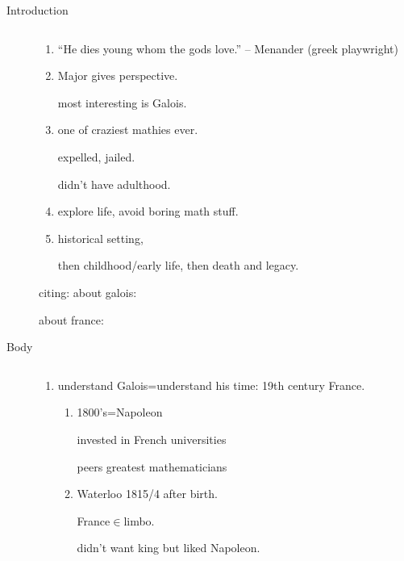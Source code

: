 \documentclass[letterpaper]{article}
\begin{document}
\begin{multicols}{2}
\renewcommand{\labelenumi}{\Roman{enumi}}
\renewcommand{\labelenumii}{\Alph{enumii}.}

\begin{description}
\item[Introduction]$\quad$

  \begin{enumerate}
  \item
  ``He dies young whom the gods love.'' -- Menander (greek playwright)
  \item
  Major gives perspective.
  
  most interesting is Galois.
  \item
  one of craziest mathies ever.

  expelled, jailed.

  didn't have adulthood.
  \item
  explore life, avoid boring math stuff.
  \item
  historical setting,

  then childhood/early life,
  then death and legacy.
  \end{enumerate}

  citing: about galois: \cite{gods}

  about france: \cite{france}
\item[Body]$\quad$

\begin{enumerate}
  \item
  understand Galois=understand his time: 19th century France.

  \begin{enumerate}
    \item
    1800's=Napoleon

    invested in French universities
    
    peers greatest mathematicians
    \item
    Waterloo 1815/4 after birth.

    France$\in$limbo.

    didn't want king but liked Napoleon.


\end{enumerate}
\end{enumerate}
\end{description}
\end{multicols}
\end{document}
